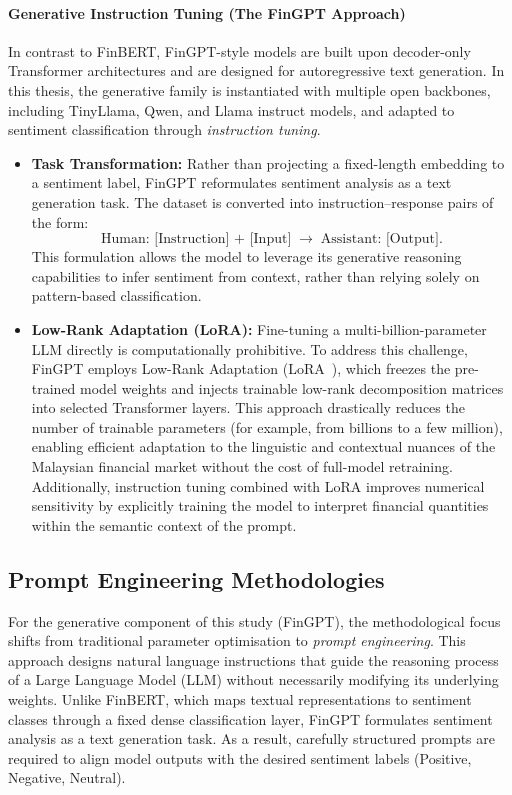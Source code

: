 \documentclass[12pt]{ucetd}
\begin{document}
\paragraph{Generative Instruction Tuning (The FinGPT Approach)}

In contrast to FinBERT, FinGPT-style models are built upon decoder-only Transformer architectures and are designed for autoregressive text generation. In this thesis, the generative family is instantiated with multiple open backbones, including TinyLlama, Qwen, and Llama instruct models, and adapted to sentiment classification through \emph{instruction tuning}.

\begin{itemize}
    \item \textbf{Task Transformation:}
    Rather than projecting a fixed-length embedding to a sentiment label, FinGPT reformulates sentiment analysis as a text generation task. The dataset is converted into instruction--response pairs of the form:
    \[
        \text{Human: [Instruction] + [Input]} \;\rightarrow\;
        \text{Assistant: [Output]}.
    \]
    This formulation allows the model to leverage its generative reasoning capabilities to infer sentiment from context, rather than relying solely on pattern-based classification.

    \item \textbf{Low-Rank Adaptation (LoRA):}
    Fine-tuning a multi-billion-parameter LLM directly is computationally prohibitive. To address this challenge, FinGPT employs Low-Rank Adaptation (LoRA~\cite{hu2022lora}), which freezes the pre-trained model weights and injects trainable low-rank decomposition matrices into selected Transformer layers. This approach drastically reduces the number of trainable parameters (for example, from billions to a few million), enabling efficient adaptation to the linguistic and contextual nuances of the Malaysian financial market without the cost of full-model retraining. Additionally, instruction tuning combined with LoRA improves numerical sensitivity by explicitly training the model to interpret financial quantities within the semantic context of the prompt.
\end{itemize}


\subsection{Prompt Engineering Methodologies}

For the generative component of this study (FinGPT), the methodological focus shifts from traditional parameter optimisation to \emph{prompt engineering}. This approach designs natural language instructions that guide the reasoning process of a Large Language Model (LLM) without necessarily modifying its underlying weights. Unlike FinBERT, which maps textual representations to sentiment classes through a fixed dense classification layer, FinGPT formulates sentiment analysis as a text generation task. As a result, carefully structured prompts are required to align model outputs with the desired sentiment labels (Positive, Negative, Neutral).
\end{document}
